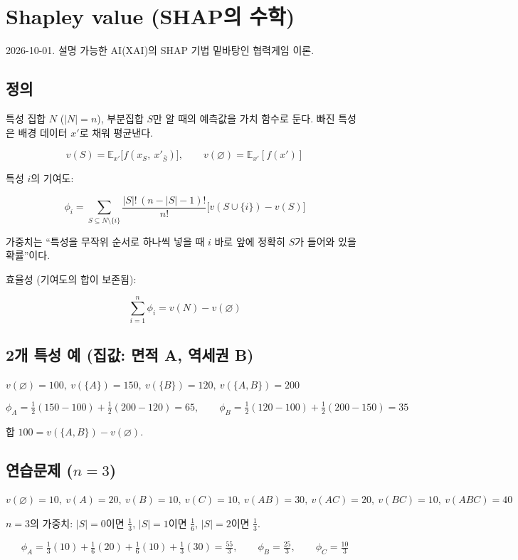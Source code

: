 \section{Shapley value (SHAP의 수학)}

2026-10-01. 설명 가능한 AI(XAI)의 SHAP 기법 밑바탕인 협력게임 이론.

\subsection{정의}

특성 집합 \(N\) (\(|N|=n\)), 부분집합 \(S\)만 알 때의 예측값을 가치
함수로 둔다. 빠진 특성은 배경 데이터 \(x'\)로 채워 평균낸다.

\[
v(S)=\mathbb E_{x'}\big[f(x_S,\ x'_{\bar S})\big],\qquad v(\varnothing)=\mathbb E_{x'}[f(x')]
\]

특성 \(i\)의 기여도:

\[
\phi_i=\sum_{S\subseteq N\setminus\{i\}}\frac{|S|!\,(n-|S|-1)!}{n!}\Big[v(S\cup\{i\})-v(S)\Big]
\]

가중치는 ``특성을 무작위 순서로 하나씩 넣을 때 \(i\) 바로 앞에 정확히
\(S\)가 들어와 있을 확률''이다.

효율성 (기여도의 합이 보존됨):

\[
\sum_{i=1}^{n}\phi_i=v(N)-v(\varnothing)
\]

\subsection{2개 특성 예 (집값: 면적 A, 역세권 B)}

\(v(\varnothing)=100,\ v(\{A\})=150,\ v(\{B\})=120,\ v(\{A,B\})=200\)

\[
\phi_A=\tfrac12(150-100)+\tfrac12(200-120)=65,\qquad \phi_B=\tfrac12(120-100)+\tfrac12(200-150)=35
\]

합 \(100=v(\{A,B\})-v(\varnothing)\).

\subsection{\texorpdfstring{연습문제 (\(n=3\))}{연습문제 (n=3)}}

\(v(\varnothing)=10,\ v(A)=20,\ v(B)=10,\ v(C)=10,\ v(AB)=30,\ v(AC)=20,\ v(BC)=10,\ v(ABC)=40\)

\(n=3\)의 가중치: \(|S|=0\)이면 \(\tfrac13\), \(|S|=1\)이면
\(\tfrac16\), \(|S|=2\)이면 \(\tfrac13\).

\[
\phi_A=\tfrac13(10)+\tfrac16(20)+\tfrac16(10)+\tfrac13(30)=\tfrac{55}{3},\qquad \phi_B=\tfrac{25}{3},\qquad \phi_C=\tfrac{10}{3}
\]

